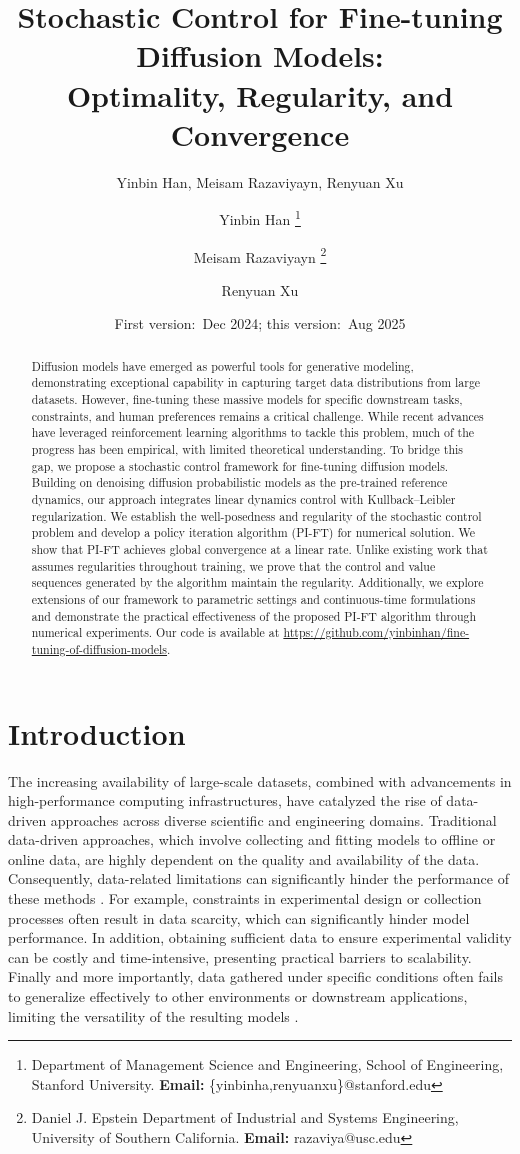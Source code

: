 \documentclass{article}
\title{Stochastic Control for Fine-tuning Diffusion Models:\\ Optimality, Regularity, and Convergence}
\author{Yinbin Han, Meisam Razaviyayn, Renyuan Xu 
}
\author{Yinbin Han
\thanks{Department of Management Science and Engineering, School of Engineering, Stanford University. \textbf{Email:} \{yinbinha,renyuanxu\}@stanford.edu}
\and
Meisam Razaviyayn \thanks{Daniel J. Epstein Department of Industrial and Systems Engineering, University of Southern California. \textbf{Email:} razaviya@usc.edu}
\and
Renyuan Xu 
  \footnotemark[1]
}
\date{First version:~Dec 2024; this version:~Aug 2025}
\begin{document}
\maketitle
\allowdisplaybreaks
\begin{abstract}
    Diffusion models have emerged as powerful tools for generative modeling, demonstrating exceptional capability in capturing target data distributions from large datasets. However, fine-tuning these massive models for specific downstream tasks, constraints, and human preferences remains a critical challenge. While recent advances have leveraged reinforcement learning algorithms to tackle this problem, much of the progress has been empirical, with limited theoretical understanding. To bridge this gap, we propose a stochastic control framework for fine-tuning diffusion models. Building on denoising diffusion probabilistic models as the pre-trained reference dynamics, our approach integrates linear dynamics control with Kullback–Leibler regularization. We establish the well-posedness and regularity of the stochastic control problem and develop a {policy iteration algorithm (PI-FT)} for numerical solution. We show that PI-FT achieves global convergence at a linear rate. Unlike existing work that assumes regularities throughout training, we prove that the control and value sequences generated by the algorithm maintain the regularity. Additionally, we explore extensions of our framework to parametric settings and continuous-time formulations and demonstrate the
practical effectiveness of the proposed PI-FT algorithm through numerical experiments.  Our code is available at \url{https://github.com/yinbinhan/fine-tuning-of-diffusion-models}.
\end{abstract}

\section{Introduction}

%

The increasing availability of large-scale datasets, combined with advancements in high-performance computing infrastructures, have catalyzed the rise of data-driven approaches across diverse scientific and engineering domains. Traditional data-driven approaches, which involve collecting and fitting models to offline or online data, are highly dependent on the quality and availability of the data. Consequently, data-related limitations can significantly hinder the performance of these methods \cite{doersch2016tutorial,durgadevi2021generative,fetaya2019understanding}. For example, constraints in experimental design or collection processes often result in data scarcity, which can significantly hinder model performance. In addition, obtaining sufficient data to ensure experimental validity can be costly and time-intensive, presenting practical barriers to scalability. Finally and more importantly, data gathered under specific conditions often fails to generalize effectively to other environments or downstream applications, limiting the versatility of the resulting models \cite{bansal2022systematic,gangwal2024current,alzubaidi2023survey}.
\end{document}
